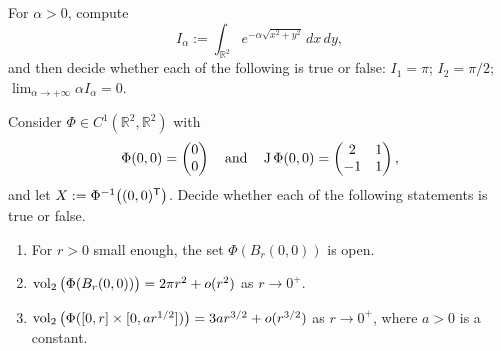 \begin{exercise}
\label{ex:radial_exponential_integral}
For $\alpha > 0$, compute
\[I_\alpha := \int_{\mathbb{R}^2} e^{-\alpha\sqrt{x^2+y^2}}\,dx\,dy,\]
and then decide whether each of the following is true or false: $I_1 = \pi$; $I_2 = \pi/2$;
$\lim_{\alpha\to+\infty}\alpha I_\alpha = 0$.
\end{exercise}

\begin{exercise}
\label{ex:examHS24_TF_image_of_small_sets}
Consider $\Phi \in C^1(\mathbb{R}^2, \mathbb{R}^2)$ with
\[\Phi(0,0) = \begin{pmatrix} 0 \\ 0 \end{pmatrix} \quad\text{and}\quad
  \operatorname{J}\Phi(0,0) = \begin{pmatrix} 2 & 1 \\ -1 & 1 \end{pmatrix},\]
and let $X := \Phi^{-1}\big((0,0)^{\mathsf{T}}\big)$. Decide whether each of the following statements is
true or false.
\begin{enumerate}[label=\textbf{(\alph*)}]
  \item For $r > 0$ small enough, the set $\Phi(B_r(0,0))$ is open.
  \item $\operatorname{vol}_2\big(\Phi(B_r(0,0))\big) = 2\pi r^2 + o(r^2)$ as $r \to 0^+$.
  \item $\operatorname{vol}_2\big(\Phi([0,r] \times [0, ar^{1/2}])\big) = 3ar^{3/2} + o(r^{3/2})$ as
    $r \to 0^+$, where $a > 0$ is a constant.
\end{enumerate}
\end{exercise}


